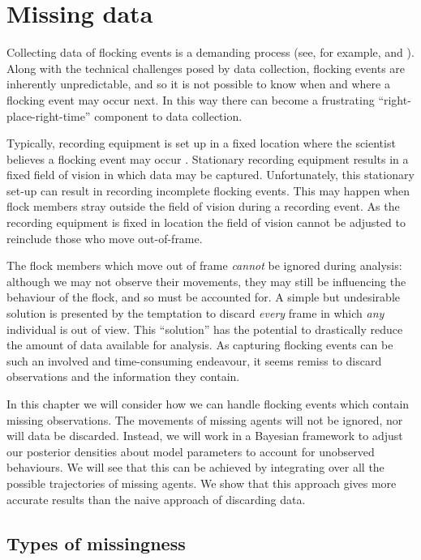 \graphicspath{{fig/missing/}}

\chapter{Missing data}
\label{cha:missing}

Collecting data of flocking events is a demanding process (see, for example,
\textcite{cavagna08a} and \textcite{lukeman10}). Along with the technical
challenges posed by data collection, flocking events are inherently
unpredictable, and so it is not possible to know when and where a flocking
event may occur next. In this way there can become a frustrating
``right-place-right-time'' component to data collection.

Typically, recording equipment is set up in a fixed location where the
scientist believes a flocking event may occur \parencite{lukeman10}. Stationary
recording equipment results in a fixed field of vision in which data may be
captured. Unfortunately, this stationary set-up can result in recording
incomplete flocking events. This may happen when flock members stray outside
the field of vision during a recording event. As the recording equipment is
fixed in location the field of vision cannot be adjusted to reinclude those who
move out-of-frame.

The flock members which move out of frame \emph{cannot} be ignored during
analysis: although we may not observe their movements, they may still be
influencing the behaviour of the flock, and so must be accounted for. A simple
but undesirable solution is presented by the temptation to discard \emph{every}
frame in which \emph{any} individual is out of view. This ``solution'' has the
potential to drastically reduce the amount of data available for analysis. As
capturing flocking events can be such an involved and time-consuming endeavour,
it seems remiss to discard observations and the information they contain.

In this chapter we will consider how we can handle flocking events which
contain missing observations. The movements of missing agents will not be
ignored, nor will data be discarded. Instead, we will work in a Bayesian framework
to adjust our posterior densities about model parameters to account for
unobserved behaviours. We will see that this can be achieved by integrating
over all the possible trajectories of missing agents. We show that
this approach gives more accurate results than the naive approach of discarding
data.

\section{Types of missingness}

